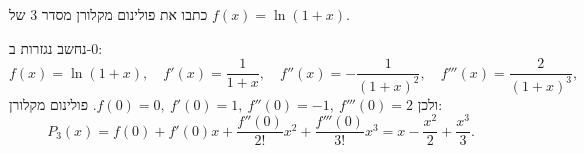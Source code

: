 
\begin{question}
כתבו את פולינום מקלורן מסדר 3 של $f(x)=\ln(1+x)$.
\end{question}

\begin{solution}
נחשב נגזרות ב-$0$:
\[ f(x)=\ln(1+x),\quad f'(x)=\frac1{1+x},\quad f''(x)=-\frac1{(1+x)^2},\quad f'''(x)=\frac{2}{(1+x)^3}, \]
ולכן $f(0)=0,\ f'(0)=1,\ f''(0)=-1,\ f'''(0)=2$. פולינום מקלורן:
\[ P_3(x)=f(0)+f'(0)x+\frac{f''(0)}{2!}x^2+\frac{f'''(0)}{3!}x^3=\boxed{x-\frac{x^2}{2}+\frac{x^3}{3}}. \]
\end{solution}
